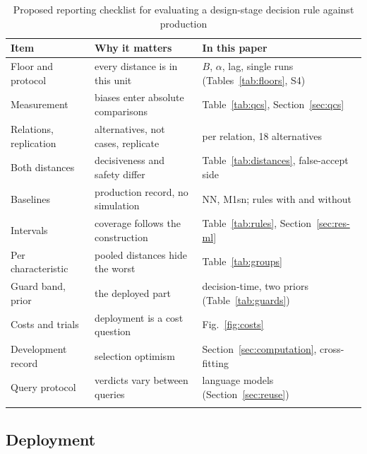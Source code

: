\documentclass[pdflatex,sn-basic,lineno]{sn-jnl}
\newcommand{\tabsize}{\fontsize{8}{9.5}\selectfont}
\begin{document}
\begin{table}[t]
\tabsize
\setlength{\tabcolsep}{3pt}
\caption{Proposed reporting checklist for evaluating a design-stage decision rule against production}\label{tab:checklist}
\begin{tabular}{@{}L{2.7cm}L{4.7cm}L{5.0cm}@{}}
\toprule
Item & Why it matters & In this paper \\
\midrule
Floor and protocol & every distance is in this unit & $B$, $\alpha$, lag, single runs (Tables~\ref{tab:floors}, S4) \\
Measurement & biases enter absolute comparisons & Table~\ref{tab:qcs}, Section~\ref{sec:qcs} \\
Relations, replication & alternatives, not cases, replicate & per relation, 18 alternatives \\
Both distances & decisiveness and safety differ & Table~\ref{tab:distances}, false-accept side \\
Baselines & production record, no simulation & NN, M1sn; rules with and without \\
Intervals & coverage follows the construction & Table~\ref{tab:rules}, Section~\ref{sec:res-ml} \\
Per characteristic & pooled distances hide the worst & Table~\ref{tab:groups} \\
Guard band, prior & the deployed part & decision-time, two priors (Table~\ref{tab:guards}) \\
Costs and trials & deployment is a cost question & Fig.~\ref{fig:costs} \\
Development record & selection optimism & Section~\ref{sec:computation}, cross-fitting \\
Query protocol & verdicts vary between queries & language models (Section~\ref{sec:reuse}) \\
\botrule
\end{tabular}
\end{table}

\subsection{Deployment}
\end{document}
